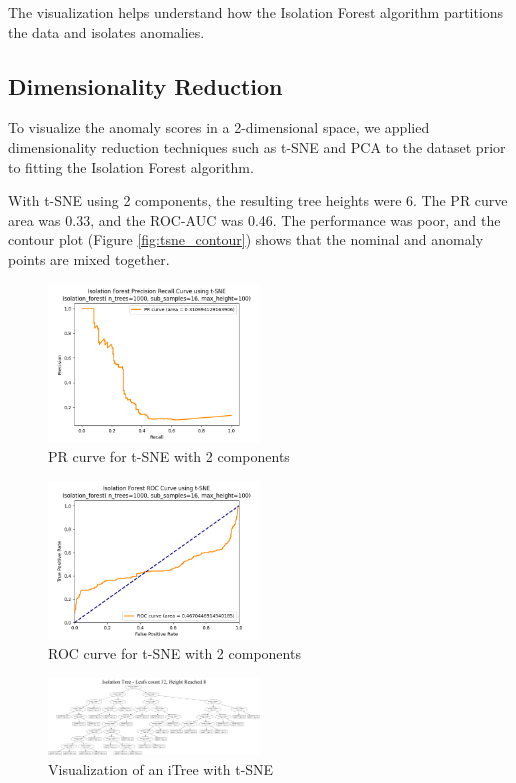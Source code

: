 The visualization helps understand how the Isolation Forest algorithm partitions the data and isolates anomalies.

\subsection{Dimensionality Reduction}
To visualize the anomaly scores in a 2-dimensional space, we applied dimensionality reduction techniques such as t-SNE and PCA to the dataset prior to fitting the Isolation Forest algorithm.

With t-SNE using 2 components, the resulting tree heights were 6. The PR curve area was 0.33, and the ROC-AUC was 0.46. The performance was poor, and the contour plot (Figure \ref{fig:tsne_contour}) shows that the nominal and anomaly points are mixed together.

\begin{figure}[htbp]
\centering
\includegraphics[width=0.5\textwidth]{resources/images/scratch_tsne_pr_curve.png}
\caption{PR curve for t-SNE with 2 components}
\label{fig:tsne_pr}
\end{figure}

\begin{figure}[htbp]
\centering
\includegraphics[width=0.5\textwidth]{resources/images/scratch_tsne_roc_curve.png}
\caption{ROC curve for t-SNE with 2 components}
\label{fig:tsne_roc}
\end{figure}

\begin{figure}[htbp]
\centering
\includegraphics[width=0.5\textwidth]{resources/images/itree_tsne_graph.png}
\caption{Visualization of an iTree with t-SNE}
\label{fig:tsne_itree}
\end{figure}

